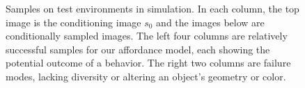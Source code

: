 \begin{figure}[t]
\begin{subfigure}[b]{0.3\textwidth}
{            }
    \end{subfigure}
    \caption{Samples on test environments in simulation. In each column, the top image is the conditioning image $s_0$ and the images below are conditionally sampled images. The left four columns are relatively successful samples for our affordance model, each showing the potential outcome of a behavior. The right two columns are failure modes, lacking diversity or altering an object's geometry or color. }
    \label{fig:samples}
\end{figure}